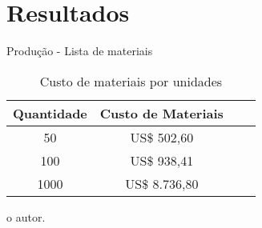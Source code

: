 \section{Resultados}
\begin{frame}{Produção - Lista de materiais}


	\begin{table}[!h]
	\captionsetup{width=9cm}%
	\caption{\label{tab:custos_fabricacao} Custo de materiais por unidades}%
% 	
		\begin{tabular}{cccc}
			\toprule
			Quantidade & Custo de Materiais  \\
			\midrule \midrule
			50 &  US\$ 502,60  \\
			100 &  US\$ 938,41 \\
			1000 & US\$ 8.736,80  \\
			\bottomrule
		\end{tabular}%
	{%
	
    }
    
    \tiny{o autor.}%
    \end{table}    

\end{frame}


